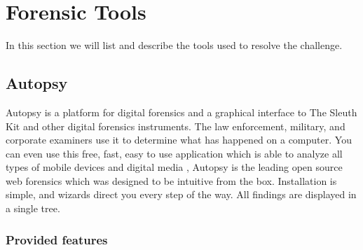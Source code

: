 \documentclass{easychair}
\begin{document}
\section{Forensic Tools}

\label{FA}In this section we will list and describe the tools used to resolve the challenge.


\subsection{Autopsy} Autopsy is a platform for digital forensics and a graphical interface to The Sleuth Kit and other digital forensics instruments. The law enforcement, military, and corporate examiners use it to determine what has happened on a computer. You can even use this free, fast, easy to use application which is able to analyze all types of mobile devices and digital media  \cite{pari_1},\cite{pari_2}
\newline Autopsy is the leading open source web forensics which was designed to be intuitive from the box. Installation is simple, and wizards direct you every step of the way. All findings are displayed in a single tree. \cite{pari_3}
\subsubsection{Provided features } 
\end{document}

